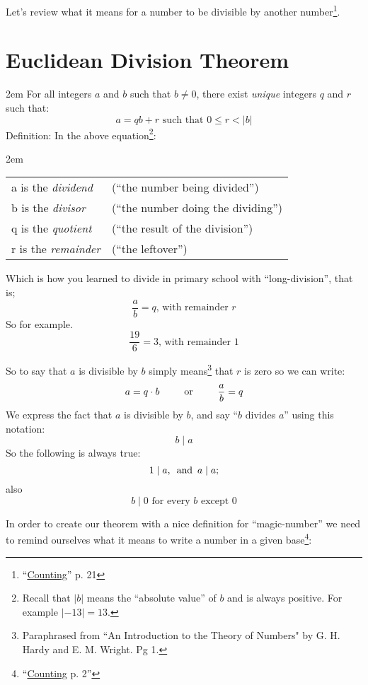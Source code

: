 \documentclass{article}
\newenvironment{jprIn}{\begin{adjustwidth}{2em}{}}{\end{adjustwidth}}
\begin{document}
Let's review what it means for a number to be divisible 
by another
number\footnote{``\href {https://www.dropbox.com/s/bwmrffmkcidnf27/basisReprThm.pdf?dl=0} {Counting}'' p. 21}.

\break
\section*{Euclidean Division Theorem}
\begin{jprIn}
For all integers $a$ and $b$ such that $b\ne0$,
there exist \emph{unique} integers $q$ and $r$ such that:
\[a=qb+r  \text{ such that } 0\le{}r<\lvert{}b\rvert\]
Definition: In the above equation\footnote{Recall
that $\lvert{}b\rvert$ means the ``absolute value'' of $b$ and is always positive. For
example $\lvert{}{-13}\rvert = 13$.}:
\begin{jprIn}
\begin{tabular}{l l}
a is the \emph{dividend} & (``the number being divided'')\\
b is the \emph{divisor} & (``the number doing the dividing'')\\
q is the \emph{quotient} & (``the result of the division'')\\
r is the \emph{remainder} & (``the leftover'')
\end{tabular}
\end{jprIn}
\end{jprIn}

Which is how you learned to divide in primary school with ``long-division'', that is;
\[\frac{a}{b}=q\text{, with remainder }r\]
So for example.
\[\frac{19}{6}=3\text{, with remainder }1\]

So to say that $a$ is divisible by $b$ simply means\footnote{Paraphrased
from ``An Introduction to the Theory of Numbers" by G. H. Hardy
and E. M. Wright. Pg 1.}
that $r$ is zero
so we can write:
\[a=q\cdot{}b\text{\hspace{2.5em}or\hspace{2.5em}}\frac{a}{b}=q\]
We express the fact that $a$ is divisible by $b$, and say
``$b$ divides $a$'' using this notation:
\[b\mid{}a\]
So the following is always true:
\[1\mid{}a,
\text{\hspace{0.5em}and\hspace{0.5em}}a\mid{}a;\]
also
\[b\mid{}0\text{ for every }b\text{ except }0\]

In order to create our theorem with a 
nice definition for ``magic-number''
we need to remind ourselves 
what it means to write a number in a given
base\footnote{``\href{https://www.dropbox.com/s/bwmrffmkcidnf27/basisReprThm.pdf?dl=0} {Counting} p. 2''}:
\end{document}
